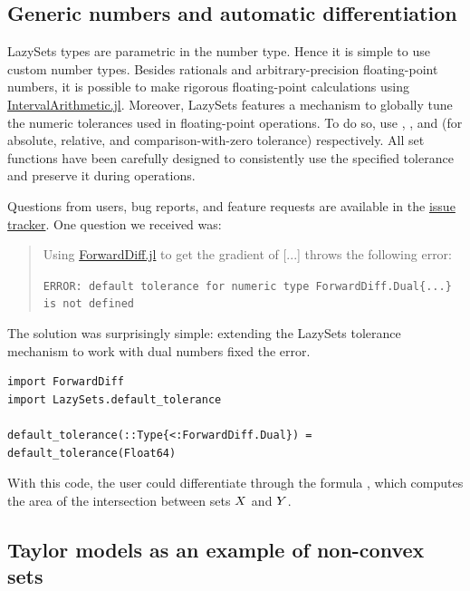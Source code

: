 \subsection{Generic numbers and automatic differentiation}\label{sec:numbertypes}

LazySets types are parametric in the number type. Hence it is simple to use custom number types.
%
Besides rationals and arbitrary-precision floating-point numbers, it is possible to make rigorous floating-point calculations using \href{https://github.com/JuliaIntervals/IntervalArithmetic.jl}{IntervalArithmetic.jl}.
%
Moreover, LazySets features a mechanism to globally tune the numeric tolerances used in floating-point operations.
%
To do so, use , , and  (for absolute, relative, and comparison-with-zero tolerance) respectively.
%
All set functions have been carefully designed to consistently use the specified tolerance and preserve it during operations.

\smallskip

Questions from users, bug reports, and feature requests are available in the \href{https://github.com/JuliaReach/LazySets.jl/issues/}{issue tracker}.
%
One question we received was:

\begin{quote}
	Using \href{https://github.com/JuliaDiff/ForwardDiff.jl}{ForwardDiff.jl} to get the gradient of [...] throws the following error:

\texttt{ERROR: default tolerance for numeric type ForwardDiff.Dual\{...\} is not defined}
\end{quote}

The solution was surprisingly simple: extending the LazySets tolerance mechanism to work with dual numbers fixed the error.

\begin{minipage}{\linewidth}
	\begin{lstlisting}
import ForwardDiff
import LazySets.default_tolerance

default_tolerance(::Type{<:ForwardDiff.Dual}) = default_tolerance(Float64)
	\end{lstlisting}
\end{minipage}
With this code, the user could differentiate through the formula , which computes the area of the intersection between sets $X$ and $Y$.


\subsection{Taylor models as an example of non-convex sets}\label{sec:taylormodels}

